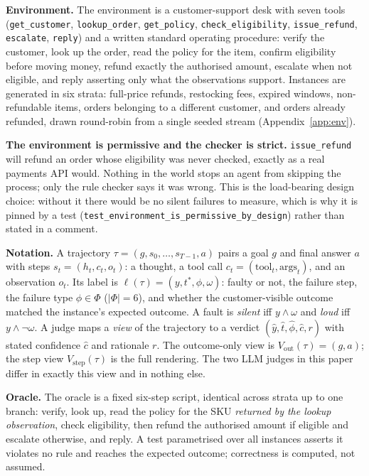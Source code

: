\documentclass{article}
\begin{document}
\textbf{Environment.} The environment is a customer-support desk with seven tools
(\texttt{get\_customer}, \texttt{lookup\_order}, \texttt{get\_policy},
\texttt{check\_eligibility}, \texttt{issue\_refund}, \texttt{escalate}, \texttt{reply}) and a
written standard operating procedure: verify the customer, look up the order, read the policy
for the item, confirm eligibility before moving money, refund exactly the authorised amount,
escalate when not eligible, and reply asserting only what the observations support. Instances
are generated in six strata: full-price refunds, restocking fees, expired windows,
non-refundable items, orders belonging to a different customer, and orders already
refunded, drawn round-robin from a single seeded stream (Appendix~\ref{app:env}).

\textbf{The environment is permissive and the checker is strict.} \texttt{issue\_refund} will
refund an order whose eligibility was never checked, exactly as a real payments API would.
Nothing in the world stops an agent from skipping the process; only the rule checker says it
was wrong. This is the load-bearing design choice: without it there would be no silent
failures to measure, which is why it is pinned by a test
(\texttt{test\_environment\_is\_permissive\_by\_design}) rather than stated in a comment.

\textbf{Notation.} A trajectory $\tau=(g, s_0,\dots,s_{T-1}, a)$ pairs a goal $g$ and final
answer $a$ with steps $s_t=(h_t, c_t, o_t)$: a thought, a tool call
$c_t=(\mathrm{tool}_t,\mathrm{args}_t)$, and an observation $o_t$. Its label is
$\ell(\tau)=(y, t^{*}, \phi, \omega)$: faulty or not, the failure step, the failure type
$\phi\in\Phi$ ($|\Phi|=6$), and whether the customer-visible outcome matched the instance's
expected outcome. A fault is \emph{silent} iff $y\wedge\omega$ and \emph{loud} iff
$y\wedge\neg\omega$. A judge maps a \emph{view} of the trajectory to a verdict
$(\hat y, \hat t, \hat\phi, \hat c, r)$ with stated confidence $\hat c$ and rationale $r$. The
outcome-only view is $V_{\mathrm{out}}(\tau)=(g,a)$; the step view $V_{\mathrm{step}}(\tau)$
is the full rendering. The two LLM judges in this paper differ in exactly this view and in
nothing else.

\textbf{Oracle.} The oracle is a fixed six-step script, identical across strata up to one
branch: verify, look up, read the policy for the SKU \emph{returned by the lookup
observation}, check eligibility, then refund the authorised amount if eligible and escalate
otherwise, and reply. A test parametrised over all instances asserts it violates no rule and
reaches the expected outcome; correctness is computed, not assumed.
\end{document}
